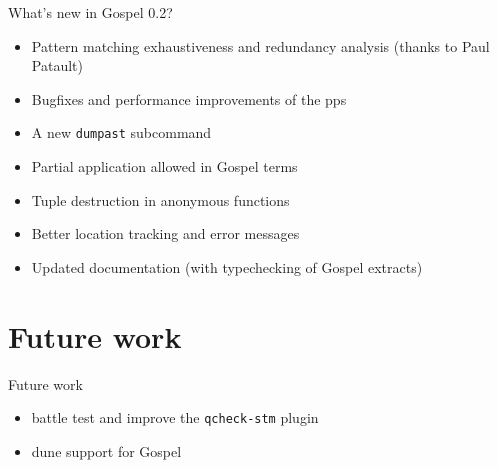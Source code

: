 \documentclass[pdf]{beamer}
\begin{document}
\begin{frame}{What's new in Gospel 0.2?}

  \begin{itemize}
    \item Pattern matching exhaustiveness and redundancy analysis (thanks to Paul Patault)
    \item Bugfixes and performance improvements of the pps
    \item A new \texttt{dumpast} subcommand
    \item Partial application allowed in Gospel terms
    \item Tuple destruction in anonymous functions
    \item Better location tracking and error messages
    \item Updated documentation (with typechecking of Gospel extracts)
  \end{itemize}

\end{frame}

\section{Future work}

\begin{frame}{Future work}

  \begin{itemize}
    \item battle test and improve the \texttt{qcheck-stm} plugin
    \item dune support for Gospel
  \end{itemize}

\end{frame}
\end{document}
